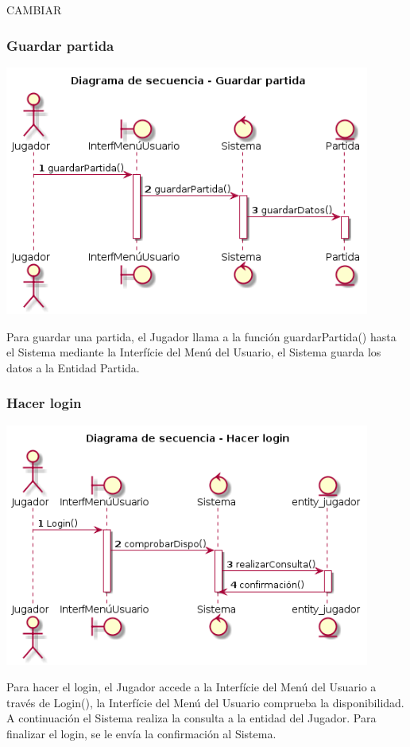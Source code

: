 CAMBIAR
  

\subsubsection{Guardar partida}
\begin{center}
  \includegraphics[width=0.9\textwidth]{./imatges/jugador/Guardar_partida.png}
  \end{center}
  Para guardar una partida, el Jugador llama a la función guardarPartida() hasta el Sistema mediante la Interfície del Menú del Usuario, el Sistema guarda los datos a la Entidad Partida.

\subsubsection{Hacer login}
\begin{center}
  \includegraphics[width=0.9\textwidth]{./imatges/jugador/Hacer_login.png}
  \end{center}
  Para hacer el login, el Jugador accede a la Interfície del Menú del Usuario a través de Login(), la Interfície del Menú del Usuario comprueba la disponibilidad. A continuación el Sistema realiza la consulta a la entidad del Jugador. Para finalizar el login, se le envía la confirmación al Sistema.

